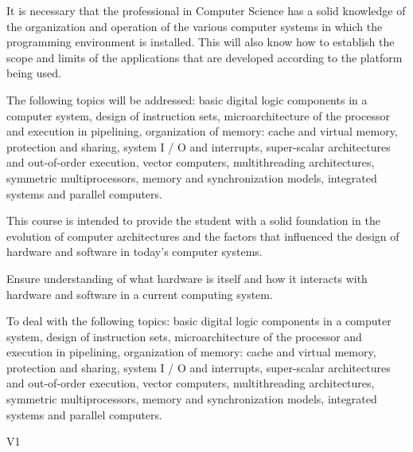 \begin{syllabus}


\begin{justification}
It is necessary that the professional in Computer Science has a solid knowledge of the organization and operation of the various computer systems in which the programming environment is installed. This will also know how to establish the scope and limits of the applications that are developed according to the platform being used.

The following topics will be addressed: basic digital logic components in a computer system, design of instruction sets, microarchitecture of the processor and execution in pipelining, organization of memory: cache and virtual memory, protection and sharing, system I / O and interrupts, super-scalar architectures and out-of-order execution, vector computers, multithreading architectures, symmetric multiprocessors, memory and synchronization models, integrated systems and parallel computers.

\end{justification}

\begin{goals}
\item This course is intended to provide the student with a solid foundation in the evolution of computer architectures and the factors that influenced the design of hardware and software in today's computer systems.
\item Ensure understanding of what hardware is itself and how it interacts with hardware and software in a current computing system.
\item To deal with the following topics: basic digital logic components in a computer system, design of instruction sets, microarchitecture of the processor and execution in pipelining, organization of memory: cache and virtual memory, protection and sharing, system I / O and interrupts, super-scalar architectures and out-of-order execution, vector computers, multithreading architectures, symmetric multiprocessors, memory and synchronization models, integrated systems and parallel computers.
\end{goals}

\begin{outcomes}{V1}
    \item {}
    \item {}
    \item {}
\end{outcomes}


\end{syllabus}
